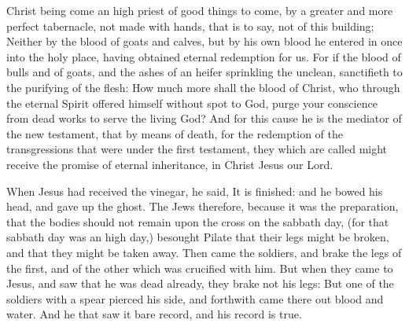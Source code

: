  Christ being come an high priest of good things to come, by a greater and more perfect tabernacle, not made with hands, that is to say, not of this building; Neither by the blood of goats and calves, but by his own blood he entered in once into the holy place, having obtained eternal redemption for us. For if the blood of bulls and of goats, and the ashes of an heifer sprinkling the unclean, sanctifieth to the purifying of the flesh: How much more shall the blood of Christ, who through the eternal Spirit offered himself without spot to God, purge your conscience from dead works to serve the living God? And for this cause he is the mediator of the new testament, that by means of death, for the redemption of the transgressions that were under the first testament, they which are called might receive the promise of eternal inheritance, in Christ Jesus our Lord.



 When Jesus had received the vinegar, he said, It is finished: and he bowed his head, and gave up the ghost. The Jews therefore, because it was the preparation, that the bodies should not remain upon the cross on the sabbath day, (for that sabbath day was an high day,) besought Pilate that their legs might be broken, and that they might be taken away. Then came the soldiers, and brake the legs of the first, and of the other which was crucified with him. But when they came to Jesus, and saw that he was dead already, they brake not his legs: But one of the soldiers with a spear pierced his side, and forthwith came there out blood and water. And he that saw it bare record, and his record is true.


